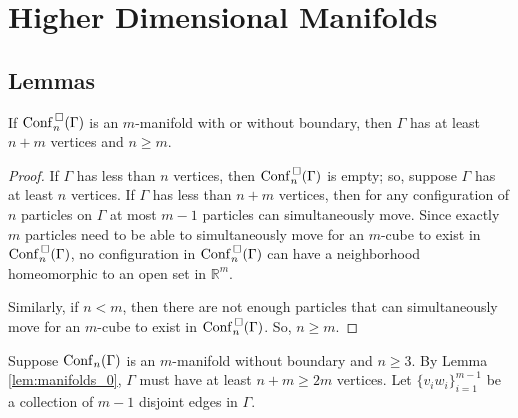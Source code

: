 \section{Higher Dimensional Manifolds}

\subsection{Lemmas}
\begin{lem}
\label{lem:manifolds_0}
If \(\mathrm{Conf}^{\,\square}_n(\Gamma)\) is an \(m\)-manifold with or without boundary, 
then \(\Gamma\) has at least \(n+m\) vertices and \(n \ge m\).
\end{lem}
\begin{proof}
    If \(\Gamma\) has less than \(n\) vertices, then \(\mathrm{Conf}^{\,\square}_n(\Gamma)\) is empty;
    so, suppose \(\Gamma\) has at least \(n\) vertices.
    If \(\Gamma\) has less than \(n + m\) vertices, then
    for any configuration of \(n\) particles on \(\Gamma\)
    at most \(m-1\) particles can simultaneously move.
    Since exactly \(m\) particles need to be able to simultaneously move for an \(m\)-cube 
    to exist in \(\mathrm{Conf}^{\,\square}_n(\Gamma)\), no configuration in \(\mathrm{Conf}^{\,\square}_n(\Gamma)\)
    can have a neighborhood homeomorphic to an open set in \(\mathbb{R}^m\).

    Similarly, if \(n < m\), then there are not enough particles that can simultaneously move
    for an \(m\)-cube to exist in \(\mathrm{Conf}^{\,\square}_n(\Gamma)\). So, \(n \ge m\). 
\end{proof}

Suppose \(\mathrm{Conf}_n(\Gamma)\) is an \(m\)-manifold without boundary and \(n \ge 3\).
By Lemma \ref{lem:manifolds_0}, \(\Gamma\) must have at least \(n + m \ge 2m\) vertices.
Let \(\{v_i w_i\}_{i=1}^{m-1}\) be a collection of \(m-1\) disjoint edges in \(\Gamma\).

